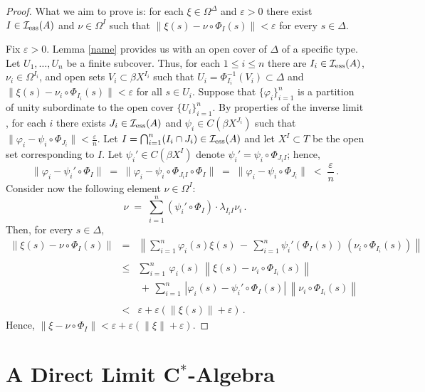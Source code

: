 \documentclass{amsart}
\theoremstyle{definition}
\theoremstyle{remark}
\begin{document}
\begin{proof}
What we aim to prove is:
for each $\xi\in\Omega^\Delta$ and $\varepsilon>0$ there exist
$I\in \mathcal I_{\rm ess}(A)$ and $\nu\in\Omega^I$ such that $\|\xi(s)-\nu\circ\Phi_I(s)\|<\varepsilon$
for every $s\in \Delta$.

Fix $\varepsilon>0$. Lemma \ref{name} provides us with an open cover of $\Delta$ of a specific type.
Let $U_1,\dots, U_n$ be a finite subcover. Thus, for
each $1\leq i\leq n$ there are $I_i\in  \mathcal I_{\rm ess}(A)$,
$\nu_i\in\Omega^{I_i}$, and open sets $V_i\subset\beta X^{I_i}$ such that $U_i=\Phi_{I_i}^{-1}(V_i)\subset\Delta$
and $\|\xi(s)-\nu_i\circ\Phi_{I_i}(s)\|<\varepsilon$ for all $s\in U_i$.
Suppose that $\{\varphi_i\}_{i=1}^n$ is a partition of unity subordinate to the open cover
$\{U_i\}_{i=1}^n$.
By properties of the inverse limit \cite{semadeni1968}, for each $i$ there exists $J_i\in\mathcal I_{\rm ess}(A)$ and
$\psi_i\in C(\beta X^{J_i})$ such that $\|\varphi_i-\psi_i\circ\Phi_{J_i}\|<\frac{\varepsilon}{n}$.
Let $I=\bigcap_{i=1}^n  (I_i\cap J_i)\in\mathcal I_{\rm ess}(A)$ and let $X^I\subset T$ be the open
set corresponding to  $I$. Let $\psi_i'\in C(\beta X^{I})$ denote
$\psi_i'=\psi_i\circ\Phi_{J_iI}$; hence,
\[
\|\varphi_i-\psi_i'\circ\Phi_I\|\;=\;\|\varphi_i-\psi_i\circ\Phi_{J_iI}\circ\Phi_I\|\;=\;
\|\varphi_i-\psi_i\circ\Phi_{J_i}\|\;<\;\frac{\varepsilon}{n}\,.
\]
Consider now the following element $\nu\in \Omega^I$:
\[
\nu\;=\;\sum_{i=1}^n ( \psi_i'\circ\Phi_{I})\cdot \lambda_{I_iI}\nu_i\,.
\]
Then, for every $s\in\Delta$,
\[
\begin{array}{rcl}
\|\xi(s)-\nu\circ\Phi_I(s)\| &=& \left\|\displaystyle\sum_{i=1}^n\varphi_i(s)\xi(s)\,
-\,\displaystyle\sum_{i=1}^n\psi_i'(\Phi_{I}(s))\,\left(\nu_i\circ\Phi_{I_i}(s)\right)
\right\| \\ && \\
&\leq&
\displaystyle\sum_{i=1}^n\, \varphi_i(s)\,\left\| \xi(s)-\nu_i\circ\Phi_{I_i}(s)\right\|  \\ && \,+\,
\displaystyle\sum_{i=1}^n  \,|\varphi_i(s)-\psi_i'\circ\Phi_{I}(s)|\, \left\| \nu_i\circ\Phi_{I_i}(s) \right\|  \\ && \\
  & < & \varepsilon + \varepsilon ( \| \xi(s)  \|  + \varepsilon )  \,.
\end{array}
\]
Hence, $\|\xi-\nu\circ\Phi_I\|< \varepsilon + \varepsilon ( \| \xi  \|  + \varepsilon )$.
\end{proof}

\section{A Direct Limit C$^*$-Algebra}\label{S:limit algs}
\end{document}
